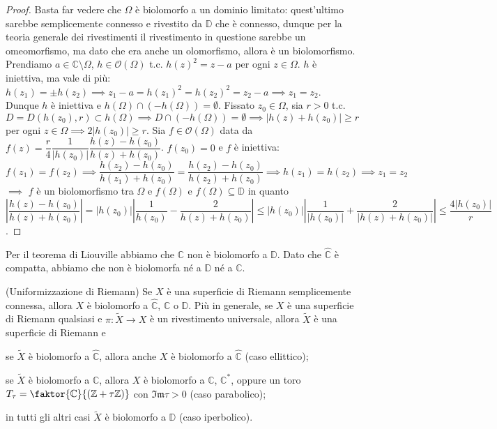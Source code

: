 \begin{proof}
  Basta far vedere che $\Omega$ è biolomorfo a un dominio limitato: quest'ultimo sarebbe semplicemente connesso e rivestito da $\mathbb{D}$ che è connesso, dunque per la teoria generale dei rivestimenti il rivestimento in questione sarebbe un omeomorfismo, ma dato che era anche un olomorfismo, allora è un biolomorfismo. Prendiamo $a \in \mathbb{C}\setminus \Omega$, $h \in \mathcal{O}(\Omega)$ t.c. $h(z)^2=z-a$ per ogni $z \in \Omega$. $h$ è iniettiva, ma vale di più: $h(z_1)=\pm h(z_2) \implies z_1-a=h(z_1)^2=h(z_2)^2=z_2-a \implies z_1=z_2$.
  Dunque $h$ è iniettiva e $h(\Omega) \cap (-h(\Omega))=\emptyset$. Fissato $z_0 \in \Omega$, sia $r>0$ t.c. $D=D(h(z_0), r) \subset h(\Omega) \implies D \cap(-h(\Omega))=\emptyset \implies |h(z)+h(z_0)| \ge r$ per ogni $z \in \Omega \implies 2|h(z_0)| \ge r$.
  Sia $f \in \mathcal{O}(\Omega)$ data da $f(z)=\dfrac{r}{4}\dfrac{1}{|h(z_0)|}\dfrac{h(z)-h(z_0)}{h(z)+h(z_0)}$. $f(z_0)=0$ e $f$ è iniettiva: $f(z_1)=f(z_2) \implies \dfrac{h(z_2)-h(z_0)}{h(z_1)+h(z_0)}=\dfrac{h(z_2)-h(z_0)}{h(z_2)+h(z_0)} \implies h(z_1)=h(z_2) \implies z_1=z_2$
  $\implies$ $f$ è un biolomorfismo tra $\Omega$ e $f(\Omega)$ e $f(\Omega) \subseteq \mathbb{D}$ in quanto $\left|\dfrac{h(z)-h(z_0)}{h(z)+h(z_0)}\right|=|h(z_0)|\left|\dfrac{1}{h(z_0)}-\dfrac{2}{h(z)+h(z_0)}\right| \le |h(z_0)|\left|\dfrac{1}{|h(z_0)|}+\dfrac{2}{|h(z)+h(z_0)|}\right| \le \dfrac{4|h(z_0)|}{r}$.
\end{proof}

Per il teorema di Liouville abbiamo che $\mathbb{C}$ non è biolomorfo a $\mathbb{D}$. Dato che $\widehat{\mathbb{C}}$ è compatta, abbiamo che non è biolomorfa né a $\mathbb{D}$ né a $\mathbb{C}$.

\begin{thm}
  (Uniformizzazione di Riemann) Se $X$ è una superficie di Riemann semplicemente connessa, allora $X$ è biolomorfo a $\widehat{\mathbb{C}}$, $\mathbb{C}$ o $\mathbb{D}$. Più in generale, se $X$ è una superficie di Riemann qualsiasi e $\pi:\widetilde{X} \longrightarrow X$ è un rivestimento universale, allora $\widetilde{X}$ è una superficie di Riemann e
  \begin{nlist}
    \item se $\widetilde{X}$ è biolomorfo a $\widehat{\mathbb{C}}$, allora anche $X$ è biolomorfo a $\widehat{\mathbb{C}}$ (caso ellittico);
    \item se $\widetilde{X}$ è biolomorfo a $\mathbb{C}$, allora $X$ è biolomorfo a $\mathbb{C}$, $\mathbb{C}^*$, oppure un toro $T_{\tau}=\faktor{\mathbb{C}}{(\mathbb{Z}+\tau \mathbb{Z})}$ con $\mathfrak{Im}\tau>0$ (caso parabolico);
    \item in tutti gli altri casi $\widetilde{X}$ è biolomorfo a $\mathbb{D}$ (caso iperbolico).
  \end{nlist}
\end{thm}

